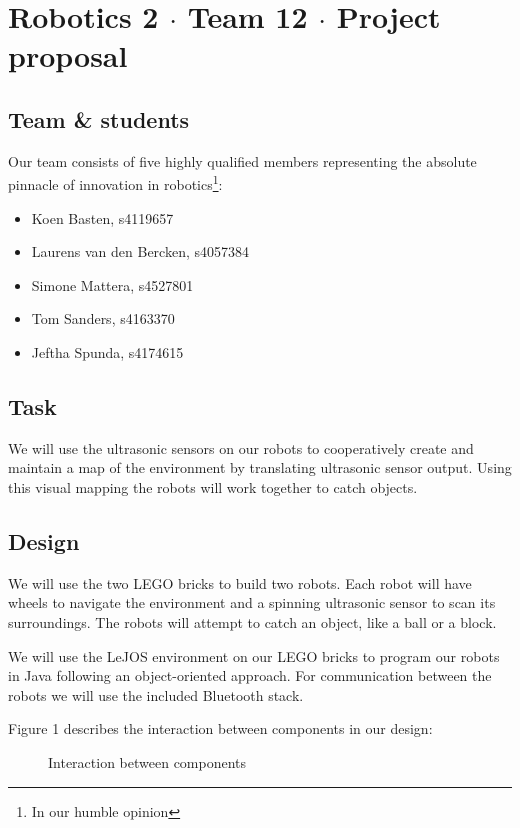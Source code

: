\documentclass[a4paper]{article}
\begin{document}
\section*{Robotics 2 \( \cdot \) Team 12 \( \cdot \) Project proposal}

\subsection*{Team \& students}
Our team consists of five highly qualified members representing the absolute pinnacle of innovation in robotics\footnote{In our humble opinion}:
\begin{itemize}
\item Koen Basten, s4119657
\item Laurens van den Bercken, s4057384
\item Simone Mattera, s4527801
\item Tom Sanders, s4163370
\item Jeftha Spunda, s4174615
\end{itemize}

\subsection*{Task}
We will use the ultrasonic sensors on our robots to cooperatively create and maintain a map of the environment by translating ultrasonic sensor output. Using this visual mapping the robots will work together to catch objects.

\subsection*{Design}
We will use the two LEGO bricks to build two robots. Each robot will have wheels to navigate the environment and a spinning ultrasonic sensor to scan its surroundings. The robots will attempt to catch an object, like a ball or a block.

We will use the LeJOS environment on our LEGO bricks to program our robots in Java following an object-oriented approach. For communication between the robots we will use the included Bluetooth stack.

Figure 1 describes the interaction between components in our design:
\begin{figure}[!h]
	\centering
	\caption{Interaction between components}
\end{figure}
\end{document}
